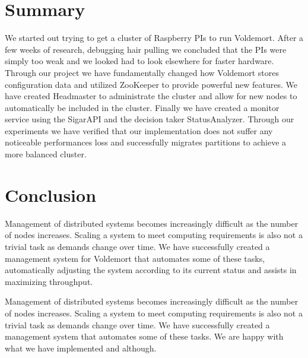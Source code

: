 \section{Summary}
We started out trying to get a cluster of Raspberry PIs to run Voldemort. After a few weeks of research, debugging hair pulling we concluded that the PIs were simply too weak and we looked had to look elsewhere for faster hardware. Through our project we have fundamentally changed how Voldemort stores configuration data and utilized ZooKeeper to provide powerful new features. We have created Headmaster to administrate the cluster and allow for new nodes to automatically be included in the cluster. Finally we have created a monitor service using the SigarAPI and the decision taker StatusAnalyzer. Through our experiments we have verified that our implementation does not suffer any noticeable performances loss and successfully migrates partitions to achieve a more balanced cluster. 

\section{Conclusion}
Management of distributed systems becomes increasingly difficult as the number of nodes increases. Scaling a system to meet computing requirements is also not a trivial task as demands change over time. We have successfully created a management system for Voldemort that automates some of these tasks, automatically adjusting the system according to its current status and assists in maximizing throughput. 

Management of distributed systems becomes increasingly difficult as the number of nodes increases. Scaling a system to meet computing requirements is also not a trivial task as demands change over time. We have successfully created a management system that automates some of these tasks. We are happy with what we have implemented and although. 





